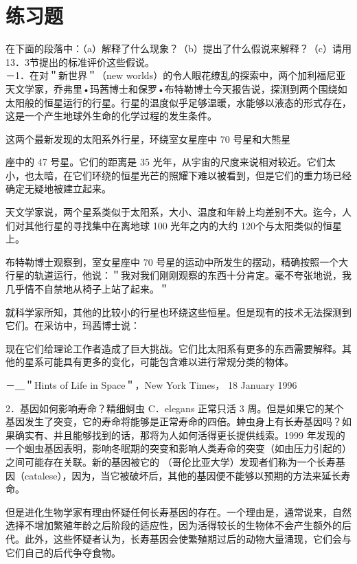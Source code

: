 \section*{练习题}
在下面的段落中：（a）解释了什么现象？（b）提出了什么假说来解释？（c）请用13．3节提出的标准评价这些假说。\\
－1．在对＂新世界＂（new worlds）的令人眼花缭乱的探索中，两个加利福尼亚天文学家，乔弗里•玛茜博士和保罗•布特勒博士今天报告说，探测到两个围绕如太阳般的恒星运行的行星。行星的温度似乎足够温暖，水能够以液态的形式存在，这是一个产生地球外生命的化学过程的发生条件。

这两个最新发现的太阳系外行星，环绕室女星座中 70 号星和大熊星

座中的 47 号星。它们的距离是 35 光年，从宇宙的尺度来说相对较近。它们太小，也太暗，在它们环绕的恒星光芒的照耀下难以被看到，但是它们的重力场已经确定无疑地被建立起来。

天文学家说，两个星系类似于太阳系，大小、温度和年龄上均差别不大。迄今，人们对其他行星的寻找集中在离地球 100 光年之内的大约 120个与太阳类似的恒星上。

布特勒博士观察到，室女星座中 70 号星的运动中所发生的摆动，精确按照一个大行星的轨道运行，他说：＂我对我们刚刚观察的东西十分肯定。毫不夸张地说，我几乎情不自禁地从椅子上站了起来。＂

就科学家所知，其他的比较小的行星也环绕这些恒星。但是现有的技术无法探测到它们。在采访中，玛茜博士说：

\begin{displayquote}
现在它们给理论工作者造成了巨大挑战。它们比太阳系有更多的东西需要解释。其他的星系可能具有更多的变化，可能包含难以进行常规分类的物体。
\end{displayquote}

－＿＂Hints of Life in Space＂，New York Times， 18 January 1996

2．基因如何影响寿命？精细蚵虫 C．elegans 正常只活 3 周。但是如果它的某个基因发生了突变，它的寿命将能够是正常寿命的四倍。蚛虫身上有长寿基因吗？如果确实有、并且能够找到的话，那将为人如何活得更长提供线索。1999 年发现的一个蛔虫基因表明，影响冬眠期的突变和影响人类寿命的突变（如由压力引起的）之间可能存在关联。新的基因被它的 （哥伦比亚大学）发现者们称为一个长寿基因（catalese），因为，当它被破坏后，其他的基因便不能够以预期的方法来延长寿命。

但是进化生物学家有理由怀疑任何长寿基因的存在。一个理由是，通常说来，自然选择不增加繁殖年龄之后阶段的适应性，因为活得较长的生物体不会产生额外的后代。此外，这些怀疑者认为，长寿基因会使繁殖期过后的动物大量涌现，它们会与它们自己的后代争夺食物。

